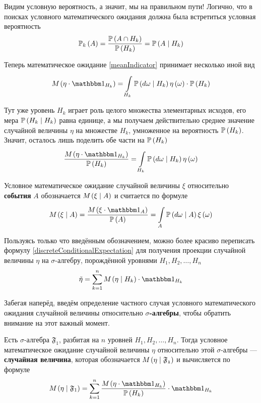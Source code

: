 Видим условную вероятность, а значит, мы на правильном пути!
Логично, что в поисках условного математического ожидания
должна была встретиться условная вероятность
$$\mathbb{P}_k\left( A \right)
    =\frac{\mathbb{P}\left( A\cap H_k \right)}{\mathbb{P}\left( H_k \right)}
    =\mathbb{P}\left( A \mid H_k \right)$$

Теперь математическое ожидание \eqref{meanIndicator}
принимает несколько иной вид
$$\mean{\left( \eta \cdot \indicatorof{H_k} \right)}
        =\integralc{H_k}{}{}{\probability{d\omega \mid H_k}}{
            \eta\left( \omega \right)} \cdot \probability{H_k}$$

Тут уже уровень $H_k$ играет роль целого множества элементарных исходов,
его мера $\mathbb{P}\left( H_k \mid H_k \right)$ равна единице,
а мы получаем действительно среднее значение случайной величины $\eta$
на множестве $H_k$, умноженное на вероятность $\mathbb{P}\left( H_k \right)$.
Значит, осталось лишь поделить обе части на $\mathbb{P}\left( H_k \right)$
$$\frac{\mean{\left( \eta \cdot \indicatorof{H_k} \right)}}{\probability{H_k}}
        =\integralc{H_k}{}{}{\probability{d\omega \mid H_k}}{
            \eta\left( \omega \right)}$$

\begin{definition}
Условное математическое
ожидание случайной величины $\xi$
относительно \textbf{события} $A$ \cite[стр.~68]{BorovkovPT}
обозначается $M_{} \left( \xi \mid A \right)$ и считается по формуле
$$\mean{\left( \xi \mid A \right)}
    = \frac{\mean{\left( \xi \cdot \indicatorof{A} \right)}}{\probability{A}}
        = \integralc{A}{}{}{\probability{d\omega \mid A}}{
            \xi\left( \omega \right)}$$
\end{definition}

Пользуясь только что введённым обозначением,
можно более красиво переписать формулу \eqref{discreteConditionalExpectation}
для получения проекции случайной величины $\eta$ на $\sigma$-алгебру,
порождённой уровнями $H_1, H_2, \dots, H_n$ 
$$\tilde{\eta}
    = \sum_{k=1}^n \mean{\left( \eta \mid H_k \right)} \cdot \indicatorof{H_k}$$

Забегая наперёд,
введём определение частного случая условного математического ожидания
случайной величины относительно \textbf{$\sigma$-алгебры},
чтобы обратить внимание на этот важный момент.

\begin{definition}
    Есть $\sigma$-алгебра $\mathfrak{F}_1$,
    разбитая на $n$ уровней $H_1, H_2, \dots, H_n$.
    Тогда условное математическое ожидание случайной величины
    $\eta$ относительно этой $\sigma$-алгебры --- \textbf{случайная величина},
    которая обозначается $M_{} \left( \eta \mid \mathfrak{F_1} \right)$
    и вычисляется по формуле
    $$\mean{\left( \eta \mid \mathfrak{F}_1 \right)}
        = \sum_{k=1}^n
            \frac{\mean{\left( \eta \cdot \indicatorof{H_k} \right)}}
                {\probability{H_k}}
            \cdot \indicatorof{H_k}$$
\end{definition}

